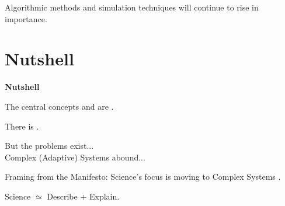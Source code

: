       Algorithmic methods and simulation techniques will continue
      to rise in importance.
\section{Nutshell}
  \textbf{Nutshell}
  
  
    The central concepts  and
     are .
  
    There is .
  
    But the problems exist...\\
    \qquad \qquad Complex (Adaptive) Systems abound...
  
    Framing from the Manifesto: Science's focus is moving to Complex Systems 
    .
  
  
    Science $\simeq$ Describe + Explain.
